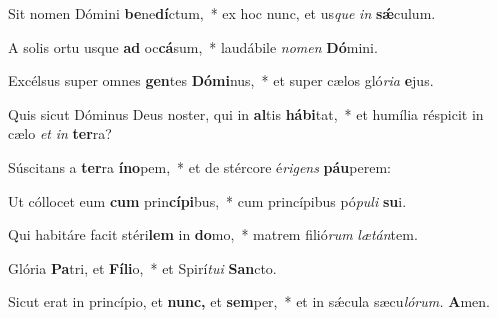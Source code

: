 \item Sit nomen Dómini \textbf{be}ne\textbf{dí}ctum,~* ex hoc nunc, et us\hspace{0.03em}\textit{que} \textit{in} \textbf{sǽ}culum.
\item A solis ortu usque \textbf{ad} oc\textbf{cá}sum,~* laudábile \textit{nomen} \textbf{Dó}mini.
\item Excélsus super omnes \textbf{gen}tes \textbf{Dómi}nus,~* et super cælos gló\textit{ria} \textbf{e}jus.
\item Quis sicut Dóminus Deus noster, qui in \textbf{al}tis \textbf{hábi}tat,~* et humília réspicit in cælo \textit{et} \textit{in} \textbf{ter}ra?
\item Súscitans a \textbf{ter}ra \textbf{íno}pem,~* et de stércore é\hspace{0.03em}\textit{rigens} \textbf{páu}perem:
\item Ut cóllocet eum \textbf{cum} prin\textbf{cípi}bus,~* cum princípibus pó\textit{puli} \textbf{su}i.
\item Qui habitáre facit stéri\textbf{lem} in \textbf{do}mo,~* matrem filió\textit{rum} \textit{lætán}tem.
\item Glória \textbf{Pa}tri, et \textbf{Fíli}o,~* et Spirí\hspace{0.03em}\textit{tui} \textbf{San}cto.
\item Sicut erat in princípio, et \textbf{nunc,} et \textbf{sem}per,~* et in sǽcula sæcu\hspace{0.03em}\textit{lórum.} \textbf{A}men.
